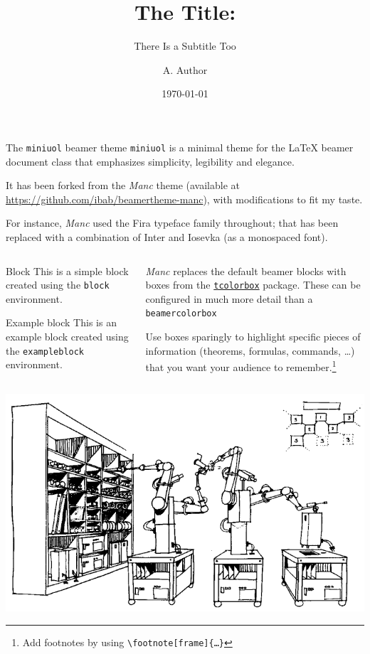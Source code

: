 \documentclass{beamer}
\title{The Title:}
\subtitle{There Is a Subtitle Too}
\date{\today}
\author{A. Author}
\institute{Institute}
\begin{document}
\begin{frame}
	\titlepage
\end{frame}

\begin{frame}{The \texttt{miniuol} beamer theme}
	\texttt{miniuol} is a minimal theme for the \LaTeX{} beamer document class that emphasizes simplicity, legibility and elegance.

	It has been forked from the \emph{Manc} theme (available at \url{https://github.com/ibab/beamertheme-manc}), with modifications to fit my taste.

	For instance, \emph{Manc} used the Fira typeface family throughout; that has been replaced with a combination of Inter and Iosevka (as a monospaced font).
\end{frame}

\begin{frame}[fragile]
	\begin{columns}
		\begin{column}{0.5\textwidth}
			\begin{block}{Block}
				This is a simple block created using the \texttt{block} environment.
			\end{block}
			\begin{exampleblock}{Example block}
				This is an example block created using the \texttt{exampleblock} environment.
			\end{exampleblock}
		\end{column}
		\begin{column}{0.5\textwidth}
			\emph{Manc} replaces the default beamer blocks with boxes from the \href{https://www.ctan.org/pkg/tcolorbox}{\texttt{tcolorbox}} package.
			These can be configured in much more detail than a \texttt{beamercolorbox}
			\medskip

			Use boxes sparingly to highlight specific pieces of information (theorems, formulas, commands, …) that you want your audience to remember.\footnote[frame]{Add footnotes by using \texttt{\backslash footnote[frame]\{…\}}}
		\end{column}
	\end{columns}
\end{frame}

\begin{frame}
	\centering
	\includegraphics[width = \textwidth]{./graphics/self-replicating.png}
\end{frame}
\end{document}
